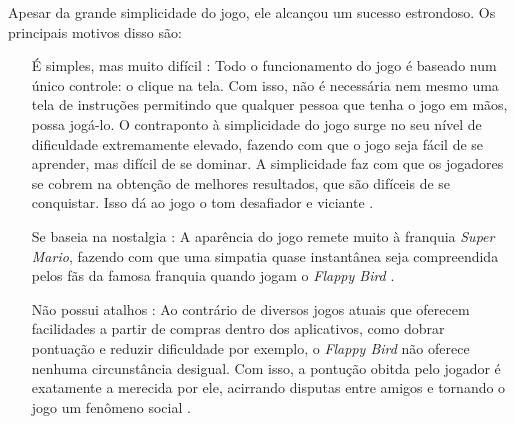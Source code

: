 Apesar da grande simplicidade do jogo, ele alcançou um sucesso estrondoso. Os principais motivos disso são:

\begin{itemize}
\item[É simples, mas muito difícil]: Todo o funcionamento do jogo é baseado num único controle: o clique na tela. Com isso, não é necessária nem mesmo uma tela de instruções permitindo que qualquer pessoa que tenha o jogo em mãos, possa jogá-lo. O contraponto à simplicidade do jogo surge no seu nível de dificuldade extremamente elevado, fazendo com que o jogo seja fácil de se aprender, mas difícil de se dominar. A simplicidade faz com que os jogadores se cobrem na obtenção de melhores resultados, que são difíceis de se conquistar. Isso dá ao jogo o tom desafiador e viciante \cite{Dino2014}.

\item[Se baseia na nostalgia]: A aparência do jogo remete muito à franquia \textit{Super Mario}, fazendo com que uma simpatia quase instantânea seja compreendida pelos fãs da famosa franquia quando jogam o \textit{Flappy Bird} \cite{Dino2014}.

\item[Não possui atalhos]: Ao contrário de diversos jogos atuais que oferecem facilidades a partir de compras dentro dos aplicativos, como dobrar pontuação e reduzir dificuldade por exemplo, o \textit{Flappy Bird} não oferece nenhuma circunstância desigual. Com isso, a pontução obitda pelo jogador é exatamente a merecida por ele, acirrando disputas entre amigos e tornando o jogo um fenômeno social \cite{Dino2014}.

\end{itemize}





